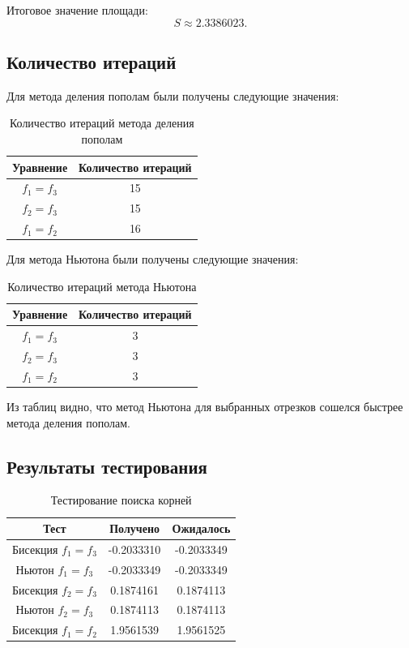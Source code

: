 \documentclass[a4paper,12pt]{article}
\begin{document}
Итоговое значение площади:
\[
S \approx 2.3386023.
\]

\subsection{Количество итераций}
Для метода деления пополам были получены следующие значения:
\begin{table}[H]
\centering
\begin{tabular}{|c|c|}
\hline
Уравнение & Количество итераций \\
\hline
$f_1=f_3$ & 15 \\
\hline
$f_2=f_3$ & 15 \\
\hline
$f_1=f_2$ & 16 \\
\hline
\end{tabular}
\caption{Количество итераций метода деления пополам}
\end{table}

Для метода Ньютона были получены следующие значения:
\begin{table}[H]
\centering
\begin{tabular}{|c|c|}
\hline
Уравнение & Количество итераций \\
\hline
$f_1=f_3$ & 3 \\
\hline
$f_2=f_3$ & 3 \\
\hline
$f_1=f_2$ & 3 \\
\hline
\end{tabular}
\caption{Количество итераций метода Ньютона}
\end{table}

Из таблиц видно, что метод Ньютона для выбранных отрезков сошелся быстрее метода деления пополам.

\subsection{Результаты тестирования}
\begin{table}[H]
\centering
\begin{tabular}{|c|c|c|}
\hline
Тест & Получено & Ожидалось \\
\hline
Бисекция $f_1=f_3$ & -0.2033310 & -0.2033349 \\
\hline
Ньютон $f_1=f_3$ & -0.2033349 & -0.2033349 \\
\hline
Бисекция $f_2=f_3$ & 0.1874161 & 0.1874113 \\
\hline
Ньютон $f_2=f_3$ & 0.1874113 & 0.1874113 \\
\hline
Бисекция $f_1=f_2$ & 1.9561539 & 1.9561525 \\
\hline
\end{tabular}
\caption{Тестирование поиска корней}
\end{table}
\end{document}
